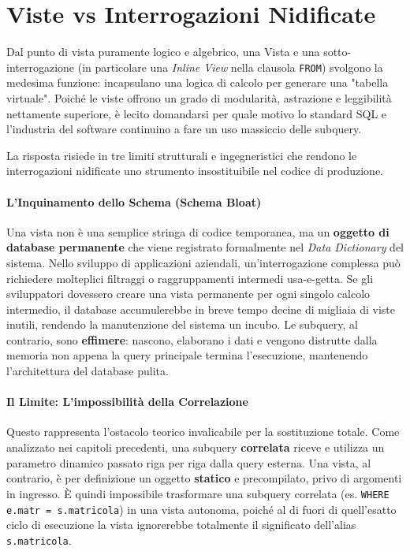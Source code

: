\section{Viste vs Interrogazioni Nidificate}

Dal punto di vista puramente logico e algebrico, una Vista e una sotto-interrogazione (in particolare una \textit{Inline View} nella clausola \texttt{FROM}) svolgono la medesima funzione: incapsulano una logica di calcolo per generare una "tabella virtuale". Poiché le viste offrono un grado di modularità, astrazione e leggibilità nettamente superiore, è lecito domandarsi per quale motivo lo standard SQL e l'industria del software continuino a fare un uso massiccio delle subquery.

La risposta risiede in tre limiti strutturali e ingegneristici che rendono le interrogazioni nidificate uno strumento insostituibile nel codice di produzione.

\paragraph{L'Inquinamento dello Schema (Schema Bloat)}
Una vista non è una semplice stringa di codice temporanea, ma un \textbf{oggetto di database permanente} che viene registrato formalmente nel \textit{Data Dictionary} del sistema. 
Nello sviluppo di applicazioni aziendali, un'interrogazione complessa può richiedere molteplici filtraggi o raggruppamenti intermedi usa-e-getta. Se gli sviluppatori dovessero creare una vista permanente per ogni singolo calcolo intermedio, il database accumulerebbe in breve tempo decine di migliaia di viste inutili, rendendo la manutenzione del sistema un incubo. 
Le subquery, al contrario, sono \textbf{effimere}: nascono, elaborano i dati e vengono distrutte dalla memoria non appena la query principale termina l'esecuzione, mantenendo l'architettura del database pulita.

\paragraph{Il Limite: L'impossibilità della Correlazione}
Questo rappresenta l'ostacolo teorico invalicabile per la sostituzione totale. Come analizzato nei capitoli precedenti, una subquery \textbf{correlata} riceve e utilizza un parametro dinamico passato riga per riga dalla query esterna.
Una vista, al contrario, è per definizione un oggetto \textbf{statico} e precompilato, privo di argomenti in ingresso. È quindi impossibile trasformare una subquery correlata (es. \texttt{WHERE e.matr = s.matricola}) in una vista autonoma, poiché al di fuori di quell'esatto ciclo di esecuzione la vista ignorerebbe totalmente il significato dell'alias \texttt{s.matricola}.

